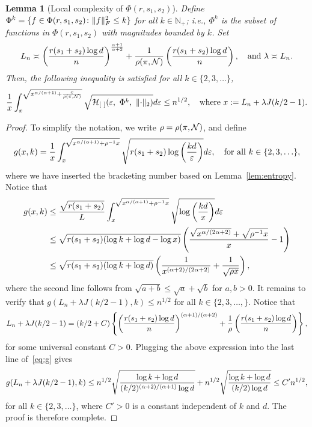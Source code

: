 \documentclass[11pt]{article}
\theoremstyle{plain}
\newtheorem{lem}{Lemma}
\theoremstyle{definition}
\begin{document}
\begin{lem}[Local complexity of $\Phi(r,s_1,s_2)$] \label{lem:metric}
Define $\Phi^{k}=\{f\in\Phi(r,s_1,s_2)\colon \lVert f\rVert_F^2\leq k\}$ for all $k\in\mathbb{N}_{+}$; i.e., $\Phi^k$ is the subset of functions in $\Phi(r,s_1,s_2)$ with magnitudes bounded by $k$. Set 
\begin{equation}\label{eq:specification}
L_n\asymp \left({r(s_1+s_2)\log d \over n } \right)^{\alpha+1\over \alpha+2} + {1\over \rho (\pi, \tN)}\left({r(s_1+s_2)\log d \over n } \right),\quad \text{and}\ 
\lambda \asymp {L_n}.
\end{equation}
Then, the following inequality is satisfied for all $k\in\{2,3,\ldots\}$,
\begin{equation}
{1\over x}\int^{\sqrt{x^{\alpha/(\alpha+1)}+{x\over \rho (\pi, \mathcal{N})}}}_{x} \sqrt{\mathcal{H}_{[\ ]}(\varepsilon,\ \Phi^{k},\ \lVert\cdot\rVert_2) }d\varepsilon \leq n^{1/2}, \quad \text{where}\ x:=L_n+\lambda J(k/2-1).
\end{equation}
\end{lem}
\begin{proof}
To simplify the notation, we write $\rho=\rho(\pi, \mathcal{N})$, and define
\begin{equation}\label{eq:complexity}
g(x, k)={1\over x}\int^{\sqrt{x^{\alpha/(\alpha+1)}+\rho^{-1}x}}_{x} \sqrt{r(s_1+s_2)\log\left({kd\over \varepsilon}\right)}d\varepsilon,\quad \text{for all }k\in\{2,3,\ldots\},
\end{equation}
where we have inserted the bracketing number based on Lemma~\ref{lem:entropy}.  Notice that
\begin{align}\label{eq:g}
g(x,k)&\leq {\sqrt{r(s_1+s_2)}\over L}\int_{x}^{\sqrt{x^{\alpha/(\alpha+1)}+\rho^{-1}x}}\sqrt{\log \left(kd \over x \right)}d\varepsilon\notag \\
&\leq \sqrt{r(s_1+s_2)(\log k+\log d - \log x)}\left({\sqrt{x^{\alpha/(2\alpha+2)}}+\sqrt{\rho^{-1}x} \over x }-1\right)\notag \\
&\leq  \sqrt{r(s_1+s_2)(\log k+\log d)}\left( {1\over x^{(\alpha+2)/(2\alpha+2)}}+{1\over \sqrt{\rho x}}\right),
\end{align}
where the second line follows from $\sqrt{a+b} \leq \sqrt{a}+\sqrt{b}$ for $a,b>0$.  It remains to verify that $g(L_n+\lambda J(k/2-1), k) \leq n^{1/2}$ for all $k\in\{2,3,\ldots,\}$. Notice that 
\[
L_n+\lambda J(k/2-1)=(k/2+C)\left\{\left( {r(s_1+s_2)\log d \over n}\right)^{(\alpha+1)/(\alpha+2)}+{1\over \rho}\left( {r(s_1+s_2)\log d \over n}\right)\right\},
\]
for some universal constant $C>0$. Plugging the above expression into the last line of~\eqref{eq:g} gives
\[
g(L_n+\lambda J(k/2-1),k)\leq n^{1/2}\sqrt{\log k+\log d\over (k/2)^{(\alpha+2)/(\alpha+1)} \log d}+n^{1/2}\sqrt{\log k+\log d \over (k/2) \log d }\leq C'n^{1/2},
\]
for all $k\in\{2,3,\ldots\}$, where $C'>0$ is a constant independent of $k$ and $d$. The proof is therefore complete. 
\end{proof}
\end{document}
